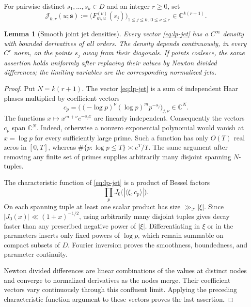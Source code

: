 \documentclass[11pt]{article}
\newtheorem{lemma}[theorem]{Lemma}
\theoremstyle{definition}
\theoremstyle{remark}
\newcommand{\C}{\mathbb C}
\begin{document}
For pairwise distinct $s_1,\ldots,s_k\in D$ and an integer $r\geq0$, set
\begin{equation}
 \mathcal J_{k,r}(u;\mathbf s)
 :=\bigl(F_{m,u}^{(\nu)}(s_j)\bigr)_
       {1\leq j\leq k,\ 0\leq\nu\leq r}
 \in\C^{k(r+1)}.
 \label{eq:lp-jet}
\end{equation}

\begin{lemma}[Smooth joint jet densities]
\label{lem:lp-jets}
Every vector \eqref{eq:lp-jet} has a $C^\infty$ density with bounded
derivatives of all orders.  The density depends continuously, in every
$C^r$ norm, on the points $s_j$ away from their diagonals.  If points coalesce,
the same assertion holds uniformly after replacing their values by Newton
divided differences; the limiting variables are the corresponding normalized
jets.
\end{lemma}

\begin{proof}
Put $N=k(r+1)$.  The vector \eqref{eq:lp-jet} is a sum of independent Haar
phases multiplied by coefficient vectors
\[
 c_p=\bigl((-\log p)^\nu(\log p)^m p^{-s_j}\bigr)_{j,\nu}\in\C^N.
\]
The functions $x\mapsto x^{m+\nu}e^{-s_jx}$ are linearly independent.
Consequently the vectors $c_p$ span $\C^N$.  Indeed, otherwise a nonzero
exponential polynomial would vanish at $x=\log p$ for every sufficiently large
prime.  Such a function has only $O(T)$ real zeros in $[0,T]$, whereas
$\#\{p:\log p\leq T\}\asymp e^T/T$.  The same argument after removing any
finite set of primes supplies arbitrarily many disjoint spanning $N$-tuples.

The characteristic function of \eqref{eq:lp-jet} is a product of Bessel
factors
\[
 \prod_pJ_0\bigl(|\langle\xi,c_p\rangle|\bigr).
\]
On each spanning tuple at least one scalar product has size
$\gg_{\mathcal T}|\xi|$.  Since $|J_0(x)|\ll(1+x)^{-1/2}$, using arbitrarily
many disjoint tuples gives decay faster than any prescribed negative power of
$|\xi|$.  Differentiating in $\xi$ or in the parameters inserts only fixed
powers of $\log p$, which remain summable on compact subsets of $D$.
Fourier inversion proves the smoothness, boundedness, and parameter
continuity.

Newton divided differences are linear combinations of the values at distinct
nodes and converge to normalized derivatives as the nodes merge.  Their
coefficient vectors vary continuously through this confluent limit.  Applying
the preceding characteristic-function argument to these vectors proves the
last assertion.
\end{proof}
\end{document}
